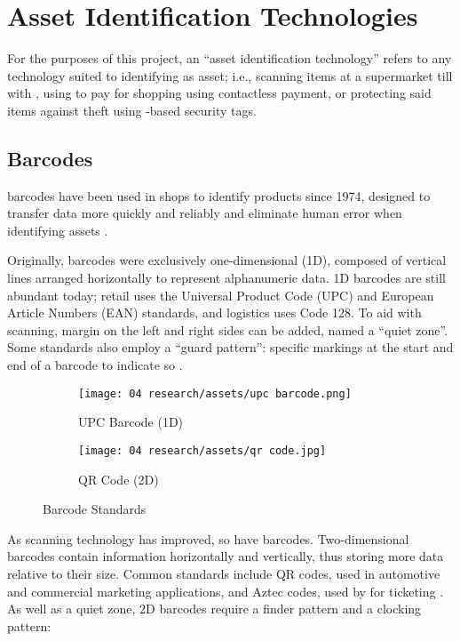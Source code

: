 \section{Asset Identification Technologies}

For the purposes of this project, an \enquote{asset
  identification technology} refers to any technology suited
to identifying as asset; i.e., scanning items at a
supermarket till with ,
using  to pay for shopping using
contactless payment, or protecting said items against theft
using -based security tags.

\subsection{Barcodes} \label{ss:barcodes}

\gls{barcodes} have been used in shops to identify products
since 1974, designed to transfer data more quickly and
reliably and eliminate human error when identifying assets
\parencite{whatIsABarcode}.

Originally, barcodes were exclusively one-dimensional (1D),
composed of vertical lines arranged horizontally to
represent alphanumeric data.
1D barcodes are still abundant today; retail uses
the Universal Product Code (UPC) and European Article
Numbers (EAN) standards, and logistics uses Code 128.
To aid with scanning, margin on the left and right sides
can be added, named a \enquote{quiet zone}.
Some standards also employ a \enquote{guard pattern}:
specific markings at the start and end of a barcode to
indicate so \parencite{whatIsABarcode}.

\begin{figure}[H]
  \centering
  \begin{subfigure}{\subfigwidth}
    \centering
    \texttt{[image: 04
      research/assets/upc barcode.png]}
    \caption{UPC Barcode (1D)}
    \parencite{img:upcBarcode}
  \end{subfigure}
  \begin{subfigure}{\subfigwidth}
    \centering
    \texttt{[image: 04
      research/assets/qr code.jpg]}
    \caption{QR Code (2D)}
    \parencite{img:qrCode}
  \end{subfigure}
  \caption{Barcode Standards}
\end{figure}

As scanning technology has improved, so have barcodes.
Two-dimensional barcodes contain information horizontally
and vertically, thus storing more data relative to their
size.
Common standards include QR codes, used in automotive and
commercial marketing applications, and Aztec codes, used by
for ticketing \parencite{whatIsABarcode}.
As well as a quiet zone, 2D barcodes require a finder
pattern and a clocking pattern: 

